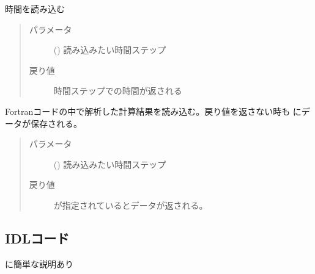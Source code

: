\documentclass[letterpaper,10pt,dvipdfmx,report]{sphinxmanual}
\begin{document}

\begin{fulllineitems}
\label{\detokenize{io:R2D2.read_time}}
時間を読み込む
\begin{quote}\begin{description}
\item[{パラメータ}] \leavevmode
{} () \sphinxhyphen{}\sphinxhyphen{} 読み込みたい時間ステップ

\item[{戻り値}] \leavevmode
時間ステップでの時間が返される

\end{description}\end{quote}

\end{fulllineitems}


\begin{fulllineitems}
\label{\detokenize{io:R2D2.read_vc}}
Fortranコードの中で解析した計算結果を読み込む。戻り値を返さない時も  にデータが保存される。
\begin{quote}\begin{description}
\item[{パラメータ}] \leavevmode
{} () \sphinxhyphen{}\sphinxhyphen{} 読み込みたい時間ステップ

\item[{戻り値}] \leavevmode
{} が指定されているとデータが返される。

\end{description}\end{quote}

\end{fulllineitems}



\subsection{IDLコード}
\label{\detokenize{io:idl}}
 に簡単な説明あり
\end{document}
